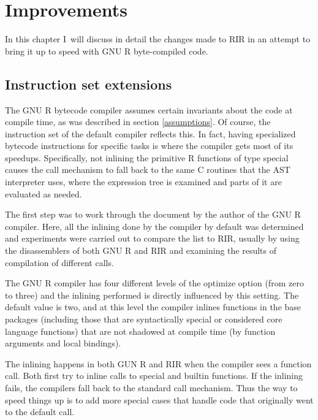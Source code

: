 \chapter{Improvements\label{improvements}}

In this chapter I~will discuss in detail the changes made to RIR in an attempt to bring it up to speed with GNU R byte-compiled code.


\section{Instruction set extensions}

The GNU R bytecode compiler assumes certain invariants about the code at compile time, as was described in section \ref{assumptions}. Of course, the instruction set of the default compiler reflects this. In fact, having specialized bytecode instructions for specific tasks is where the compiler gets most of its speedups. Specifically, not inlining the primitive R functions of type \todo[verb]special causes the call mechanism to fall back to the same C routines that the AST interpreter uses, where the expression tree is examined and parts of it are evaluated as needed.

The first step was to work through the document \autocite{compiler} by the author of the GNU R compiler. Here, all the inlining done by the compiler by default was determined and experiments were carried out to compare the list to RIR, usually by using the disassemblers of both GNU R and RIR and examining the results of compilation of different calls.

The GNU R compiler has four different levels of the \todo[verb]optimize option (from zero to three) and the inlining performed is directly influenced by this setting. The default value is two, and at this level the compiler inlines functions in the base packages (including those that are syntactically special or considered core language functions) that are not shadowed at compile time (by function arguments and local bindings).

The inlining happens in both GUN R and RIR when the compiler sees a function call. Both first try to inline calls to special and builtin functions. If the inlining fails, the compilers fall back to the standard call mechanism. Thus the way to speed things up is to add more special cases that handle code that originally went to the default call.

